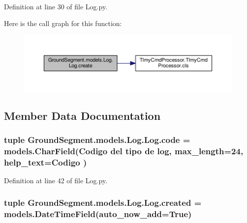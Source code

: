 Definition at line 30 of file Log.\+py.



Here is the call graph for this function\+:\nopagebreak
\begin{figure}[H]
\begin{center}
\leavevmode
\includegraphics[width=350pt]{class_ground_segment_1_1models_1_1_log_1_1_log_a68eae7e99771c95ea2ba04e8f6492f0a_cgraph}
\end{center}
\end{figure}




\subsection{Member Data Documentation}
\hypertarget{class_ground_segment_1_1models_1_1_log_1_1_log_ae8de250667b9b871ac02617cae717eef}{}
\subsubsection[{code}]{\setlength{\rightskip}{0pt plus 5cm}tuple Ground\+Segment.\+models.\+Log.\+Log.\+code = models.\+Char\+Field(\textquotesingle{}Codigo del tipo de log\textquotesingle{}, max\+\_\+length=24, help\+\_\+text=\textquotesingle{}Codigo\textquotesingle{} )\hspace{0.3cm}{\ttfamily [static]}}\label{class_ground_segment_1_1models_1_1_log_1_1_log_ae8de250667b9b871ac02617cae717eef}


Definition at line 42 of file Log.\+py.

\hypertarget{class_ground_segment_1_1models_1_1_log_1_1_log_acb07a0dee966edc415ff1e5edd2d44cb}{}
\subsubsection[{created}]{\setlength{\rightskip}{0pt plus 5cm}tuple Ground\+Segment.\+models.\+Log.\+Log.\+created = models.\+Date\+Time\+Field(auto\+\_\+now\+\_\+add=True)\hspace{0.3cm}{\ttfamily [static]}}\label{class_ground_segment_1_1models_1_1_log_1_1_log_acb07a0dee966edc415ff1e5edd2d44cb}


